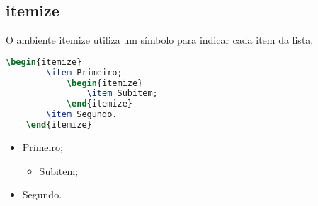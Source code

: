 \subsection{\textsf{itemize}}
O ambiente \textsf{itemize} utiliza um símbolo para indicar cada item da lista. \\
\begin{minipage}[t]{0.47\linewidth} \vspace{-8pt}
    \begin{lstlisting}[language=TeX]
    \begin{itemize}
        \item Primeiro;
            \begin{itemize}
                \item Subitem;
            \end{itemize}
        \item Segundo.
    \end{itemize}
    \end{lstlisting}
\end{minipage} \hfill
\begin{minipage}[t]{0.47\linewidth} \vspace{0pt}
    \begin{itemize}
        \item Primeiro;
            \begin{itemize}
                \item Subitem;
            \end{itemize}
        \item Segundo.
    \end{itemize}
\end{minipage}

